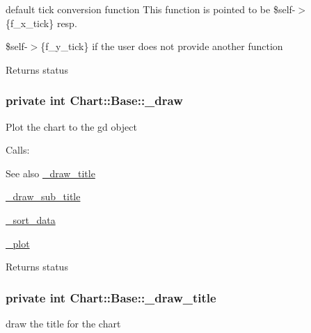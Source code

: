 default tick conversion function This function is pointed to be \$self-\/$>$\{f\_\-x\_\-tick\} resp. 

\$self-\/$>$\{f\_\-y\_\-tick\} if the user does not provide another function

\begin{DoxyReturn}{Returns}
status 
\end{DoxyReturn}
\hypertarget{classChart_1_1Base_ab021c0dceb1ae55e1697bbee667480fa}{
\subsubsection[{\_\-draw}]{\setlength{\rightskip}{0pt plus 5cm}private int {\bf Chart::Base::\_\-draw}}}
\label{classChart_1_1Base_ab021c0dceb1ae55e1697bbee667480fa}


Plot the chart to the gd object\par
 Calls: 

\begin{DoxySeeAlso}{See also}
\hyperlink{classChart_1_1Base_aa3467472a4c4a598c5a2f64de8c438c1}{\_\-draw\_\-title} 

\hyperlink{classChart_1_1Base_afd4f3ee3925d1e765e099c80e6c98da7}{\_\-draw\_\-sub\_\-title} 

\hyperlink{classChart_1_1Base_ade88df5ecdc74e50ea683b63424ba84a}{\_\-sort\_\-data} 

\hyperlink{classChart_1_1Base_aa13b0e86a933ce6b865c098fd0bdb37d}{\_\-plot}
\end{DoxySeeAlso}
\begin{DoxyReturn}{Returns}
status 
\end{DoxyReturn}
\hypertarget{classChart_1_1Base_aa3467472a4c4a598c5a2f64de8c438c1}{
\subsubsection[{\_\-draw\_\-title}]{\setlength{\rightskip}{0pt plus 5cm}private int {\bf Chart::Base::\_\-draw\_\-title}}}
\label{classChart_1_1Base_aa3467472a4c4a598c5a2f64de8c438c1}


draw the title for the chart 

